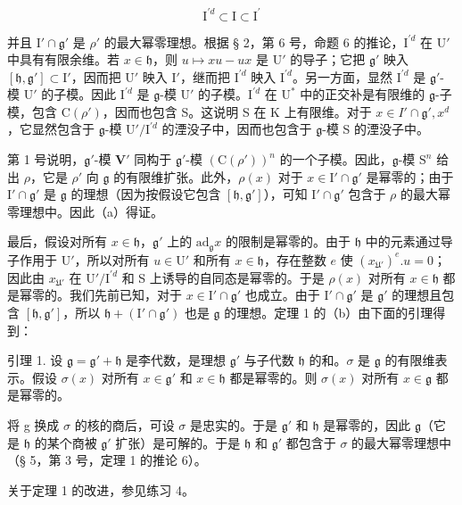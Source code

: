 \[
\mathrm{I} ^ {\prime d} \subset \mathrm{I} \subset \mathrm{I} ^ {\prime}
\]

并且 \(\mathrm{I}'\cap \mathfrak{g}'\) 是 \(\rho'\) 的最大幂零理想。根据 § 2，第 6 号，命题 6 的推论，\(\mathrm{I}^{\prime d}\) 在 \(\mathrm{U}'\) 中具有有限余维。若 \(x\in \mathfrak{h}\)，则 \(u\mapsto xu - ux\) 是 \(\mathrm{U}'\) 的导子；它把 \(\mathfrak{g}'\) 映入 \([\mathfrak{h},\mathfrak{g}']\subset \mathrm{I}'\)，因而把 \(\mathrm{U}'\) 映入 \(\mathrm{I}'\)，继而把 \(\mathrm{I}^{\prime d}\) 映入 \(\mathrm{I}^{\prime d}\)。另一方面，显然 \(\mathrm{I}^{\prime d}\) 是 \(\mathfrak{g}'\)-模 \(\mathrm{U}'\) 的子模。因此 \(\mathrm{I}^{\prime d}\) 是 \(\mathfrak{g}\)-模 \(\mathrm{U}'\) 的子模。\(\mathrm{I}^{\prime d}\) 在 \(\mathrm{U}^*\) 中的正交补是有限维的 \(\mathfrak{g}\)-子模，包含 \(\mathrm{C}(\rho')\)，因而也包含 S。这说明 S 在 K 上有限维。对于 \(x\in I'\cap \mathfrak{g}', x^d\)，它显然包含于 \(\mathfrak{g}\)-模 \(\mathrm{U}' / \mathrm{I}^{\prime d}\) 的湮没子中，因而也包含于 \(\mathfrak{g}\)-模 S 的湮没子中。

第 1 号说明，\(\mathfrak{g}'\)-模 \(\mathbf{V}'\) 同构于 \(\mathfrak{g}'\)-模 \((\mathrm{C}(\rho'))^n\) 的一个子模。因此，\(\mathfrak{g}\)-模 \(\mathrm{S}^n\) 给出 \(\rho\)，它是 \(\rho'\) 向 \(\mathfrak{g}\) 的有限维扩张。此外，\(\rho(x)\) 对于 \(x \in \mathrm{I}' \cap \mathfrak{g}'\) 是幂零的；由于 \(\mathrm{I}' \cap \mathfrak{g}'\) 是 \(\mathfrak{g}\) 的理想（因为按假设它包含 \([\mathfrak{h},\mathfrak{g}']\)），可知 \(\mathrm{I}'\cap \mathfrak{g}'\) 包含于 \(\rho\) 的最大幂零理想中。因此（a）得证。

最后，假设对所有 \(x \in \mathfrak{h}\)，\(\mathfrak{g}'\) 上的 \(\mathrm{ad}_{\mathfrak{g}}x\) 的限制是幂零的。由于 \(\mathfrak{h}\) 中的元素通过导子作用于 \(\mathrm{U}'\)，所以对所有 \(u \in \mathrm{U}'\) 和所有 \(x \in \mathfrak{h}\)，存在整数 \(e\) 使 \((x_{\mathfrak{U}'})^e.u = 0\)；因此由 \(x_{\mathfrak{U}'}\) 在 \(\mathrm{U}' / \mathrm{I}^{\prime d}\) 和 S 上诱导的自同态是幂零的。于是 \(\rho(x)\) 对所有 \(x \in \mathfrak{h}\) 都是幂零的。我们先前已知，对于 \(x \in \mathrm{I}' \cap \mathfrak{g}'\) 也成立。由于 \(\mathrm{I}' \cap \mathfrak{g}'\) 是 \(\mathfrak{g}'\) 的理想且包含 \([\mathfrak{h}, \mathfrak{g}']\)，所以 \(\mathfrak{h} + (\mathrm{I}' \cap \mathfrak{g}')\) 也是 \(\mathfrak{g}\) 的理想。定理 1 的（b）由下面的引理得到：

引理 1. 设 \(\mathfrak{g} = \mathfrak{g}' + \mathfrak{h}\) 是李代数，是理想 \(\mathfrak{g}'\) 与子代数 \(\mathfrak{h}\) 的和。\(\sigma\) 是 \(\mathfrak{g}\) 的有限维表示。假设 \(\sigma(x)\) 对所有 \(x \in \mathfrak{g}'\) 和 \(x \in \mathfrak{h}\) 都是幂零的。则 \(\sigma(x)\) 对所有 \(x \in \mathfrak{g}\) 都是幂零的。

将 g 换成 \(\sigma\) 的核的商后，可设 \(\sigma\) 是忠实的。于是 \(\mathfrak{g}'\) 和 \(\mathfrak{h}\) 是幂零的，因此 \(\mathfrak{g}\)（它是 \(\mathfrak{h}\) 的某个商被 \(\mathfrak{g}'\) 扩张）是可解的。于是 \(\mathfrak{h}\) 和 \(\mathfrak{g}'\) 都包含于 \(\sigma\) 的最大幂零理想中（§ 5，第 3 号，定理 1 的推论 6）。

关于定理 1 的改进，参见练习 4。

